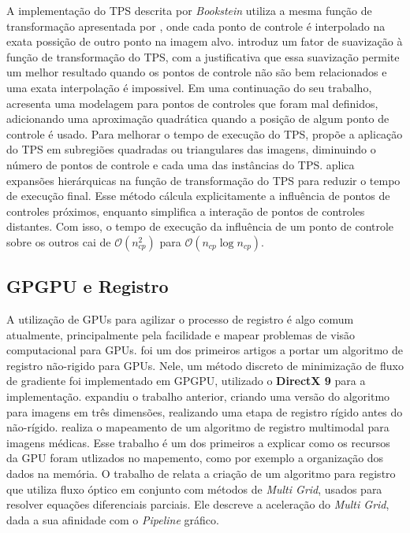   A implementação do TPS descrita por \textit{Bookstein} utiliza a mesma
função de transformação apresentada por \cite{goshtasby1988registration}, onde
cada ponto de controle é interpolado na exata possição de outro ponto na
imagem alvo. \cite{rohr1996nonrigid} introduz um fator de suavização à função
de transformação do TPS, com a justificativa que essa suavização permite um
melhor resultado quando os pontos de controle não são bem relacionados e uma
exata interpolação é impossivel. Em uma continuação do seu trabalho,
\cite{rohr2001landmark} acresenta uma modelagem para pontos de controles que
foram mal definidos, adicionando uma aproximação quadrática quando a posição
de algum ponto de controle é usado. Para melhorar o tempo de execução do TPS,
\cite{flusser1992adaptive} propõe a aplicação do TPS em subregiões quadradas ou
triangulares das imagens, diminuindo o número de pontos de controle e cada uma
das instâncias do TPS. \cite{beatson1992fast} aplica expansões hierárquicas na
função de transformação do TPS para reduzir o tempo de execução final. Esse
método cálcula explicitamente a influência de pontos de controles próximos,
enquanto simplifica a interação de pontos de controles distantes. Com isso,
o tempo de execução da influência de um ponto de controle sobre os outros cai de
$\mathcal{O}(n_{cp}^2)$ para $\mathcal{O}(n_{cp}\log{n_{cp}})$.

\subsection{GPGPU e Registro}

  A utilização de GPUs para agilizar o processo de registro é algo comum
atualmente, principalmente pela facilidade e mapear problemas de visão
computacional para GPUs. \cite{strzodka2004image} foi um dos primeiros artigos
a portar um algoritmo de registro não-rigido para GPUs. Nele, um método discreto
de minimização de fluxo de gradiente foi implementado em GPGPU, utilizado o
\textbf{DirectX 9} para a implementação. \cite{kohn2006gpu} expandiu o trabalho
anterior, criando uma versão do algoritmo para imagens em três dimensões,
realizando uma etapa de registro rígido antes do não-rígido. \cite{vetter2007non}
realiza o mapeamento de um algoritmo de registro multimodal para imagens médicas.
Esse trabalho é um dos primeiros a explicar como os recursos da GPU foram
utlizados no mapemento, como por exemplo a organização dos dados na memória.
O trabalho de \cite{grossauer2008gpu} relata a criação de um algoritmo para
registro que utiliza fluxo óptico em conjunto com métodos de \textit{Multi Grid},
usados para resolver equações diferenciais parciais. Ele descreve a aceleração
do \textit{Multi Grid}, dada a sua afinidade com o \textit{Pipeline} gráfico.

